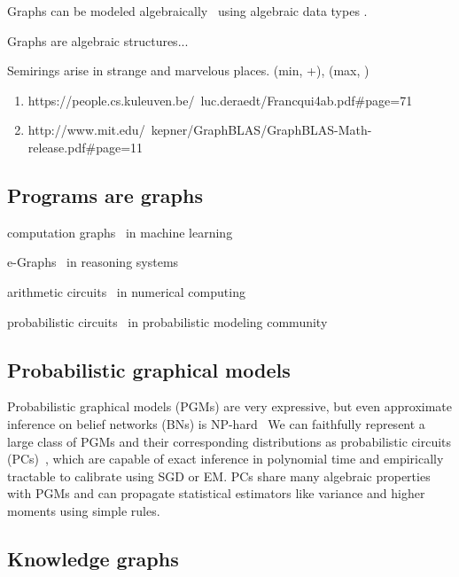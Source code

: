 \documentclass[11pt]{article}
\begin{document}
    Graphs can be modeled algebraically~\citep{weisfeiler1968reduction}  using algebraic data types \citep{mokhov2017algebraic}.

    Graphs are algebraic structures...

    Semirings arise in strange and marvelous places. (min, +), (max, \times)

    \begin{enumerate}
        \item https://people.cs.kuleuven.be/~luc.deraedt/Francqui4ab.pdf#page=71
        \item http://www.mit.edu/~kepner/GraphBLAS/GraphBLAS-Math-release.pdf#page=11
    \end{enumerate}

    \subsection{Programs are graphs}\label{sec:program-graphs}

    computation graphs~\citep{breuleux2017automatic} in machine learning

    e-Graphs~\citep{willsey2020egg} in reasoning systems

    arithmetic circuits~\citep{miller1988efficient} in numerical computing

    probabilistic circuits~\citep{choi2020probabilistic} in probabilistic modeling community

    \subsection{Probabilistic graphical models}\label{sec:pgms}

    Probabilistic graphical models (PGMs) are very expressive, but even approximate inference on belief networks (BNs) is NP-hard~\citep{dagum1993approximating} We can faithfully represent a large class of PGMs and their corresponding distributions as probabilistic circuits (PCs)~\citep{choi2020probabilistic}, which are capable of exact inference in polynomial time and empirically tractable to calibrate using SGD or EM. PCs share many algebraic properties with PGMs and can propagate statistical estimators like variance and higher moments using simple rules.

    \subsection{Knowledge graphs}
\end{document}
